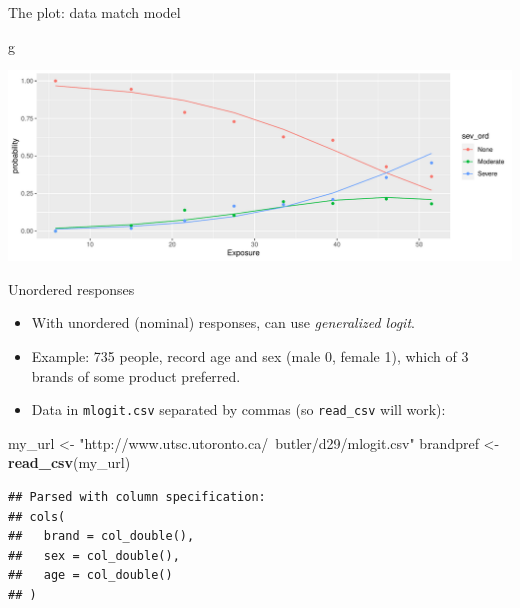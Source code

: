 \documentclass[
  ignorenonframetext,
]{beamer}
\newenvironment{Shaded}{\begin{snugshade}}{\end{snugshade}}
\newcommand{\KeywordTok}[1]{\textcolor[rgb]{0.13,0.29,0.53}{\textbf{#1}}}
\newcommand{\NormalTok}[1]{#1}
\newcommand{\StringTok}[1]{\textcolor[rgb]{0.31,0.60,0.02}{#1}}
\begin{document}
\begin{frame}[fragile]{The plot: data match model}
\protect\hypertarget{the-plot-data-match-model}{}

\begin{Shaded}
\begin{Highlighting}[]
\NormalTok{g}
\end{Highlighting}
\end{Shaded}

\includegraphics{slides_d29_files/figure-beamer/unnamed-chunk-125-1.pdf}

\end{frame}

\begin{frame}[fragile]{Unordered responses}
\protect\hypertarget{unordered-responses}{}

\begin{itemize}
\item
  With unordered (nominal) responses, can use \emph{generalized logit}.
\item
  Example: 735 people, record age and sex (male 0, female 1), which of 3
  brands of some product preferred.
\item
  Data in \texttt{mlogit.csv} separated by commas (so \texttt{read\_csv}
  will work):
\end{itemize}

\begin{Shaded}
\begin{Highlighting}[]
\NormalTok{my_url <-}\StringTok{ "http://www.utsc.utoronto.ca/~butler/d29/mlogit.csv"}
\NormalTok{brandpref <-}\StringTok{ }\KeywordTok{read_csv}\NormalTok{(my_url)}
\end{Highlighting}
\end{Shaded}

\begin{verbatim}
## Parsed with column specification:
## cols(
##   brand = col_double(),
##   sex = col_double(),
##   age = col_double()
## )
\end{verbatim}

\end{frame}
\end{document}
